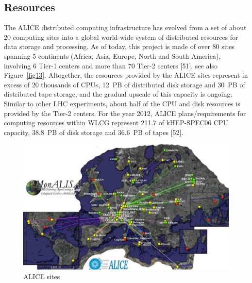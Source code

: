 \documentclass{intech}
\begin{document}
\subsection{Resources}
%
The ALICE distributed computing infrastructure has evolved from a
set of about 20 computing sites into a global world-wide system of
distributed resources for data storage and processing. As of today,
this project is made of over 80 sites spanning 5 continents (Africa,
Asia, Europe, North and South America), involving 6 Tier-1 centers
and more than 70 Tier-2 centers [51], see also Figure~\ref{fig13}.
Altogether, the resources provided by the ALICE sites represent in
excess of 20 thousands of CPUs, 12~PB of distributed disk storage
and 30~PB of distributed tape storage, and the gradual upscale of
this capacity is ongoing.  Similar to other LHC experiments, about
half of the CPU and disk resources is provided by the Tier-2
centers. For the year 2012, ALICE plans/requirements for computing
resources within WLCG represent 211.7 of kHEP-SPEC06 CPU capacity,
38.8~PB of disk storage and 36.6~PB of tapes [52].

\begin{figure}[htb] %
\centering
\includegraphics[width=13cm]{fig14.eps} %
\caption{ALICE sites}\label{fig14}
\end{figure}
\end{document}

